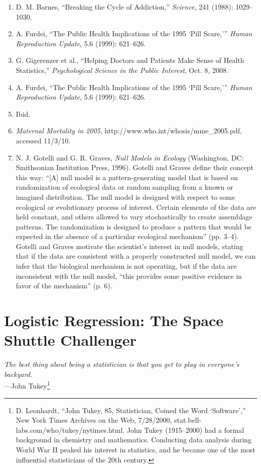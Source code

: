 \documentclass[
]{report}
\begin{document}
\begin{enumerate}
\item D. M. Barnes, “Breaking the Cycle of Addiction,” \textit{Science}, 241 (1988): 1029–1030.
\item A. Furdei, “The Public Health Implications of the 1995 ‘Pill Scare,’” \textit{Human Reproduction Update}, 5.6 (1999): 621–626.
\item G. Gigerenzer et al., “Helping Doctors and Patients Make Sense of Health Statistics,” \textit{Psychological Science in the
Public Interest}, Oct. 8, 2008.
\item A. Furdei, “The Public Health Implications of the 1995 ‘Pill Scare,’” \textit{Human Reproduction Update}, 5.6 (1999):
621–626.
\item Ibid.
\item \textit{Maternal Mortality in 2005}, http://www.who.int/whosis/mme\_2005.pdf, accessed 11/3/10.
\item N. J. Gotelli and G. R. Graves, \textit{Null Models in Ecology} (Washington, DC: Smithsonian Institution Press, 1996).
Gotelli and Graves define their concept this way: “[A] null model is a pattern-generating model that is based on
randomization of ecological data or random sampling from a known or imagined distribution. The null model is
designed with respect to some ecological or evolutionary process of interest. Certain elements of the data are held
constant, and others allowed to vary stochastically to create assemblage patterns. The randomization is designed to
produce a pattern that would be expected in the absence of a particular ecological mechanism” (pp. 3–4). Gotelli
and Graves motivate the scientist’s interest in null models, stating that if the data are consistent with a properly
constructed null model, we can infer that the biological mechanism is not operating, but if the data are inconsistent
with the null model, “this provides some positive evidence in favor of the mechanism” (p. 6).

\end{enumerate}

\chapter{Logistic Regression: The Space Shuttle Challenger}\label{logistic-regression-the-space-shuttle-challenger}

{ \emph{The best thing about being a statistician is that you get to play in everyone's backyard.}}\\
{ ---John Tukey\footnote{D. Leonhardt, ``John Tukey, 85, Statistician, Coined the Word `Software','' New York Times Archives on the Web, 7/28/2000, stat.bell-labs.com/who/tukey/nytimes.html. John Tukey (1915--2000) had a formal background in chemistry and mathematics. Conducting data analysis during World War II peaked his interest in statistics, and he became one of the most influential statisticians of the 20th century.}}
\end{document}
